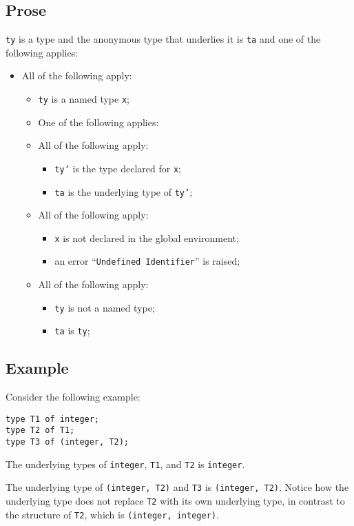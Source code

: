\documentclass{book}
\begin{document}
\subsection{Prose}
\texttt{ty} is a type and the anonymous type that underlies it is \texttt{ta} and one of the following
applies:
\begin{itemize}
    \item All of the following apply:
      \begin{itemize}
        \item \texttt{ty} is a named type \texttt{x};
        \item One of the following applies:
        \item All of the following apply:
        \begin{itemize}
        \item \texttt{ty'} is the type declared for \texttt{x}; 
        \item \texttt{ta} is the underlying type of \texttt{ty'};
        \end{itemize}
        \item All of the following apply:
        \begin{itemize}
        \item \texttt{x} is not declared in the global environment; 
        \item an error ``\texttt{Undefined Identifier}'' is raised;
        \end{itemize}
        \item All of the following apply:
        \begin{itemize}
        \item \texttt{ty} is not a named type;
        \item \texttt{ta} is \texttt{ty};
      \end{itemize}
    \end{itemize}
\end{itemize}
  
\subsection{Example}
Consider the following example:
\begin{verbatim}
type T1 of integer;
type T2 of T1;
type T3 of (integer, T2);
\end{verbatim}

The underlying types of \texttt{integer}, \texttt{T1}, and \texttt{T2} is \texttt{integer}.

The underlying type of \texttt{(integer, T2)} and \texttt{T3} is
\texttt{(integer, T2)}.  Notice how the underlying type does not replace
\texttt{T2} with its own underlying type, in contrast to the structure of
\texttt{T2}, which is \texttt{(integer, integer)}.
\end{document}
